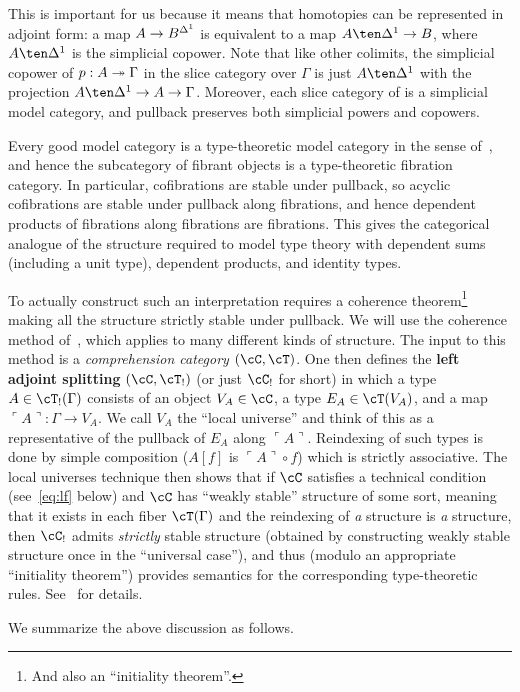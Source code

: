 \documentclass{amsart}
\def\name#1{\ulcorner #1\urcorner}
\let\C\cC
\let\T\cT
\begin{document}
This is important for us because it means that homotopies can be represented in adjoint form: a map $A\to B^{\Delta^1}$ is equivalent to a map $A\ten \ivl \to B$, where $A\ten \ivl$ is the simplicial copower.
Note that like other colimits, the simplicial copower of $p:A\twoheadrightarrow \Gamma$ in the slice category over $\Gamma$ is just $A\ten\ivl$ with the projection $A\ten\ivl \to A \to \Gamma$.
Moreover, each slice category of \sM is a simplicial model category, and pullback preserves both simplicial powers and copowers.

Every good model category is a type-theoretic model category in the sense of~\cite{shulman:invdia}, and hence the subcategory of fibrant objects is a type-theoretic fibration category.
In particular, cofibrations are stable under pullback, so acyclic cofibrations are stable under pullback along fibrations, and hence dependent products of fibrations along fibrations are fibrations.
This gives the categorical analogue of the structure required to model type theory with dependent sums (including a unit type), dependent products, and identity types.

To actually construct such an interpretation requires a coherence theorem\footnote{And also an ``initiality theorem''.} making all the structure strictly stable under pullback.
We will use the coherence method of~\cite{lw:localuniv}, which applies to many different kinds of structure.
The input to this method is a \emph{comprehension category} $(\C,\T)$.
One then defines the \textbf{left adjoint splitting} $(\C,\T_!)$ (or just $\C_!$ for short) in which a type $A\in \T_!(\Gamma)$ consists of an object $V_A\in\C$, a type $E_A\in\T(V_A)$, and a map $\name{A}:\Gamma\to V_A$.
We call $V_A$ the ``local universe'' and think of this as a representative of the pullback of $E_A$ along $\name{A}$.
Reindexing of such types is done by simple composition ($A[f]$ is $\name{A}\circ f$) which is strictly associative.
The local universes technique then shows that if $\C$ satisfies a technical condition (see~\eqref{eq:lf} below) and $\C$ has ``weakly stable'' structure of some sort, meaning that it exists in each fiber $\T(\Gamma)$ and the reindexing of \emph{a} structure is \emph{a} structure, then $\C_!$ admits \emph{strictly} stable structure (obtained by constructing weakly stable structure once in the ``universal case''), and thus (modulo an appropriate ``initiality theorem'') provides semantics for the corresponding type-theoretic rules.
See~\cite{lw:localuniv} for details.

We summarize the above discussion as follows.
\end{document}
